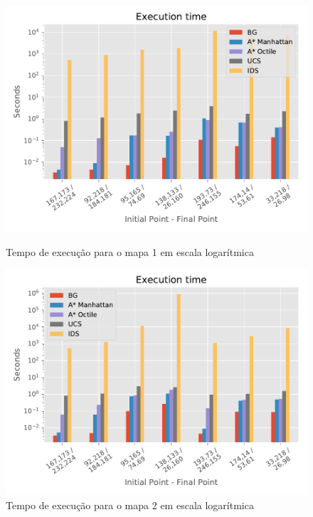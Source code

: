 \begin{figure}[!htbp]
\begin{minipage}{0.5\linewidth}
\centering
\includegraphics[width=\textwidth]{Images/Execution_time_map1_log.pdf}
\caption{Tempo de execução para o mapa 1 em escala logarítmica}
\label{fig:time1}
\end{minipage}%
\begin{minipage}{0.5\linewidth}
\centering
\includegraphics[width=\textwidth]{Images/Execution_time_map2_log.pdf}
\caption{Tempo de execução para o mapa 2 em escala logarítmica}
\label{fig:time2}
\end{minipage}
\begin{minipage}{0.5\linewidth}
\centering

\end{minipage}
\end{figure}
